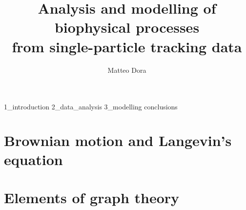 \documentclass{mthesis}
\title{Analysis and modelling of biophysical processes\\from single-particle tracking data}
\author{Matteo Dora}
\begin{document}
\maketitle

\tableofcontents

{1_introduction}
{2_data_analysis}
{3_modelling}
{conclusions}

\begin{appendices}
  \chapter{Brownian motion and Langevin's equation}
  \chapter{Elements of graph theory}
\end{appendices}

\nocite{*}
\printbibliography
\end{document}
